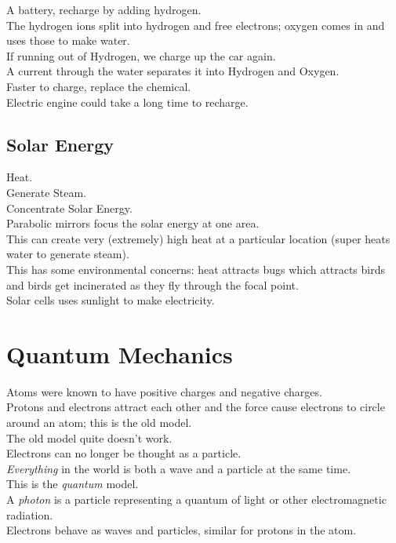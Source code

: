 \documentclass[12pt]{article}
\theoremstyle{definition}
\begin{document}
A battery, recharge by adding hydrogen. \\

The hydrogen ions split into hydrogen and free electrons;
oxygen comes in and uses those to make water. \\

If running out of Hydrogen, we charge up the car again. \\

A current through the water separates it into Hydrogen and Oxygen. \\

Faster to charge, replace the chemical. \\
Electric engine could take a long time to recharge.

\subsection{Solar Energy}
Heat. \\
Generate Steam. \\
Concentrate Solar Energy. \\

Parabolic mirrors focus the solar energy at one area. \\
This can create very (extremely) high heat at a particular location (super heats water to generate steam). \\
This has some environmental concerns: heat attracts bugs which attracts birds and birds get incinerated as they fly through the focal point. \\

Solar cells uses sunlight to make electricity.

\newpage
\section{Quantum Mechanics}
Atoms were known to have positive charges and negative charges. \\
Protons and electrons attract each other and the force cause electrons to circle around an atom;
this is the old model. \\

The old model quite doesn't work. \\
Electrons can no longer be thought as a particle. \\
\emph{Everything} in the world is both a wave and a particle at the same time. \\
This is the \emph{quantum} model. \\
A \emph{photon} is a particle representing a quantum of light or other electromagnetic radiation. \\
Electrons behave as waves and particles, similar for protons in the atom. \\
\end{document}
